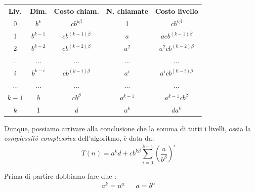 \begin{table}[H]
	\centering
	\begin{tabular}{ccccc}
		\toprule
		Liv.     & Dim.      & Costo chiam.      & N. chiamate & Costo livello        \\
		\midrule
		0        & $b^k$     & $cb^{k\beta}$     & 1           & $cb^{k\beta}$        \\
		1        & $b^{k-1}$ & $cb^{(k-1)\beta}$ & $a$         & $acb^{(k-1)\beta}$   \\
		2        & $b^{k-2}$ & $cb^{(k-2)\beta}$ & $a^2$       & $a^2cb^{(k-2)\beta}$ \\
		$\ldots$ & $\ldots$  & $\ldots$          & $\ldots$    & $\ldots$             \\
		$i$      & $b^{k-i}$ & $cb^{(k-i)\beta}$ & $a^i$       & $a^icb^{(k-i)\beta}$ \\
		$\ldots$ & $\ldots$  & $\ldots$          & $\ldots$    & $\ldots$             \\
		$k-1$    & $b$       & $cb^{\beta}$      & $a^{k-1}$   & $a^{k-1}cb^{\beta}$  \\
		$k$      & 1         & $d$               & $a^k$       & $da^k$               \\
		\bottomrule
	\end{tabular}
\end{table}
Dunque, possiamo arrivare alla conclusione che la somma di tutti i livelli, ossia la \textit{complessitò complessiva} dell'algoritmo, è data da:
\[
	T\left(n\right) = a^{k} d + c b ^{k \beta }  \sum_{i=0}^{k-1} \left(\frac{a}{b^{\beta }}\right)^{i}
\]

Prima di partire dobbiamo fare due :
\begin{align*}
	a^{k} = n^{\alpha} &  & a = b^{\alpha}
\end{align*}

